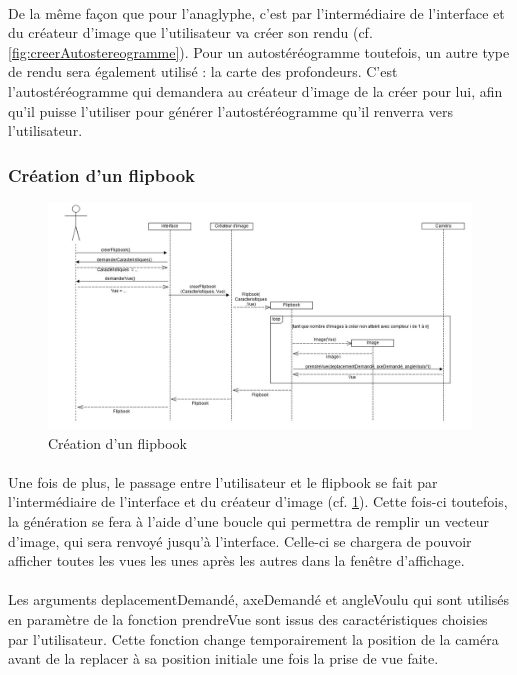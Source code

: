 \paragraph{}
De la même façon que pour l’anaglyphe, c’est par l’intermédiaire de l’interface et du créateur d’image que l’utilisateur va créer son rendu (cf. \ref{fig:creerAutostereogramme}). Pour un autostéréogramme toutefois, un autre type de rendu sera également utilisé : la carte des profondeurs. C’est l’autostéréogramme qui demandera au créateur d’image de la créer pour lui, afin qu’il puisse l’utiliser pour générer l’autostéréogramme qu’il renverra vers l’utilisateur.

\newpage

\subsubsection{Création d'un flipbook}

\begin{figure}[h]
		\centering
		\includegraphics[scale=0.4]{creerflipbook.jpg}
		\caption{\label{fig:creerFlip} Création d'un flipbook}
\end{figure}

\paragraph{}
Une fois de plus, le passage entre l’utilisateur et le flipbook se fait par l’intermédiaire de l’interface et du créateur d’image (cf. \ref{fig:creerFlip}). Cette fois-ci toutefois, la génération se fera à l’aide d’une boucle qui permettra de remplir un vecteur d’image, qui sera renvoyé jusqu’à l’interface. Celle-ci se chargera de pouvoir afficher toutes les vues les unes après les autres dans la fenêtre d’affichage.

\paragraph{}
Les arguments deplacementDemandé, axeDemandé et angleVoulu qui sont utilisés en paramètre de la fonction prendreVue sont issus des caractéristiques choisies par l'utilisateur. Cette fonction change temporairement la position de la caméra avant de la replacer à sa position initiale une fois la prise de vue faite.


